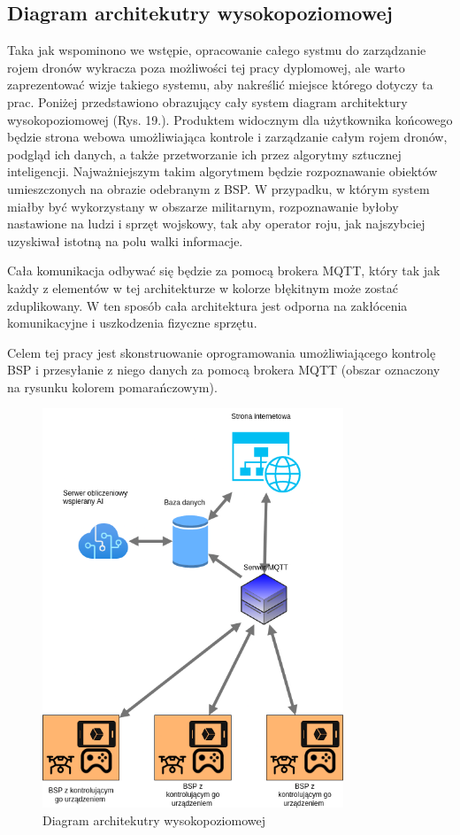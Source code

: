\newpage
\subsection{Diagram architekutry wysokopoziomowej}

Taka jak wspominono we wstępie, opracowanie całego systmu do zarządzanie rojem dronów wykracza poza możliwości tej pracy dyplomowej, ale warto zaprezentować wizje takiego systemu, aby nakreślić miejsce którego dotyczy ta prac. Poniżej przedstawiono obrazujący cały system diagram architektury wysokopoziomowej (Rys. 19.).  Produktem widocznym dla użytkownika końcowego będzie strona webowa umożliwiająca kontrole i zarządzanie całym rojem dronów, podgląd ich danych, a także przetworzanie ich przez algorytmy sztucznej inteligencji. Najważniejszym takim algorytmem będzie rozpoznawanie obiektów umieszczonych na obrazie odebranym z BSP. W przypadku, w którym system miałby być wykorzystany w obszarze militarnym, rozpoznawanie byłoby nastawione na ludzi i sprzęt wojskowy, tak aby operator roju, jak najszybciej uzyskiwał istotną na polu walki informacje.

Cała komunikacja odbywać się będzie za pomocą brokera MQTT, który tak jak każdy z elementów w tej architekturze w kolorze błękitnym może zostać zduplikowany. W ten sposób cała architektura jest odporna na zakłócenia komunikacyjne i uszkodzenia fizyczne sprzętu.

Celem tej pracy jest skonstruowanie oprogramowania umożliwiającego kontrolę BSP i przesyłanie z niego danych za pomocą brokera MQTT (obszar oznaczony na rysunku kolorem pomarańczowym).


\begin{figure}[!ht]
\begin{center}
  \includegraphics[width=9cm]{./Obrazy/highlevel.png}
  \caption{Diagram architekutry wysokopoziomowej}
\end{center}
\end{figure}

